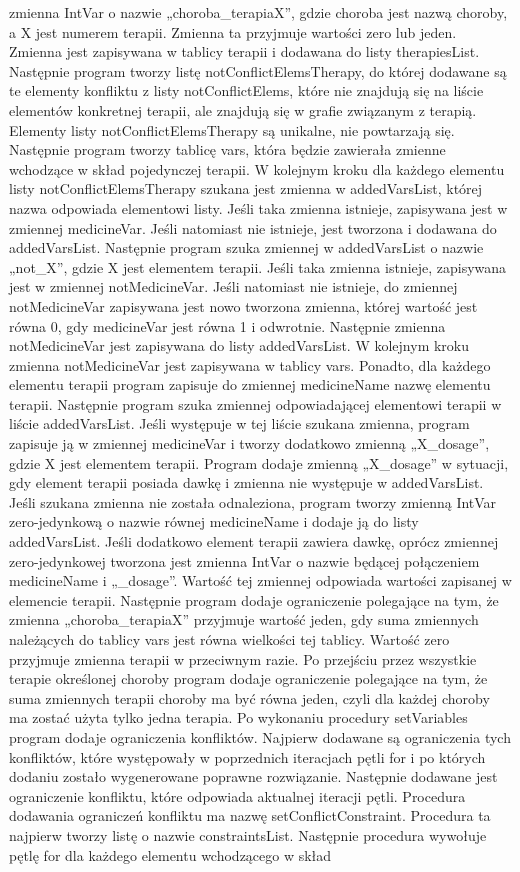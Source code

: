 \documentclass[oneside,a4paper]{book}
\begin{document}
\begin{spacing}{1.5}
zmienna IntVar o nazwie „choroba\_terapiaX”, gdzie choroba jest nazwą choroby, a X jest numerem terapii. Zmienna ta przyjmuje wartości zero lub jeden. Zmienna jest zapisywana w tablicy terapii i dodawana do listy therapiesList. Następnie program tworzy listę notConflictElemsTherapy, do której dodawane są te elementy konfliktu z listy notConflictElems, które nie znajdują się na liście elementów konkretnej terapii, ale znajdują się w grafie związanym z terapią. Elementy listy notConflictElemsTherapy są unikalne, nie powtarzają się. Następnie program tworzy tablicę vars, która będzie zawierała zmienne wchodzące w skład pojedynczej terapii. W kolejnym kroku dla każdego elementu listy notConflictElemsTherapy szukana jest zmienna w addedVarsList, której nazwa odpowiada elementowi listy. Jeśli taka zmienna istnieje, zapisywana jest w zmiennej medicineVar. Jeśli natomiast nie istnieje, jest tworzona i dodawana do addedVarsList. Następnie program szuka zmiennej w addedVarsList o nazwie „not\_X”, gdzie X jest elementem terapii. Jeśli taka zmienna istnieje, zapisywana jest w zmiennej notMedicineVar. Jeśli natomiast nie istnieje, do zmiennej notMedicineVar zapisywana jest nowo tworzona zmienna, której wartość jest równa 0, gdy medicineVar jest równa 1 i odwrotnie. Następnie zmienna notMedicineVar jest zapisywana do listy addedVarsList. W kolejnym kroku zmienna notMedicineVar jest zapisywana w tablicy vars. Ponadto, dla każdego elementu terapii program zapisuje do zmiennej medicineName nazwę elementu terapii. Następnie program szuka zmiennej odpowiadającej elementowi terapii w liście addedVarsList. Jeśli występuje w tej liście szukana zmienna, program zapisuje ją w zmiennej medicineVar i tworzy dodatkowo zmienną „X\_dosage”, gdzie X jest elementem terapii. Program dodaje zmienną „X\_dosage” w sytuacji, gdy element terapii posiada dawkę i zmienna nie występuje w addedVarsList. Jeśli szukana zmienna nie została odnaleziona, program tworzy zmienną IntVar zero-jedynkową o nazwie równej medicineName i dodaje ją do listy addedVarsList. Jeśli dodatkowo element terapii zawiera dawkę, oprócz zmiennej zero-jedynkowej tworzona jest zmienna IntVar o nazwie będącej połączeniem medicineName i „\_dosage”. Wartość tej zmiennej odpowiada wartości zapisanej w elemencie terapii. Następnie program dodaje ograniczenie polegające na tym, że zmienna „choroba\_terapiaX” przyjmuje wartość jeden, gdy suma zmiennych należących do tablicy vars jest równa wielkości tej tablicy. Wartość zero przyjmuje zmienna terapii w przeciwnym razie. Po przejściu przez wszystkie terapie określonej choroby program dodaje ograniczenie polegające na tym, że suma zmiennych terapii choroby ma być równa jeden, czyli dla każdej choroby ma zostać użyta tylko jedna terapia. Po wykonaniu procedury setVariables program dodaje ograniczenia konfliktów. Najpierw dodawane są ograniczenia tych konfliktów, które występowały w poprzednich iteracjach pętli for i po których dodaniu zostało wygenerowane poprawne rozwiązanie. Następnie dodawane jest ograniczenie konfliktu, które odpowiada aktualnej iteracji pętli. Procedura dodawania ograniczeń konfliktu ma nazwę setConflictConstraint. Procedura ta najpierw tworzy listę o nazwie constraintsList. Następnie procedura wywołuje pętlę for dla każdego elementu wchodzącego w skład 
\end{spacing}
\end{document}
